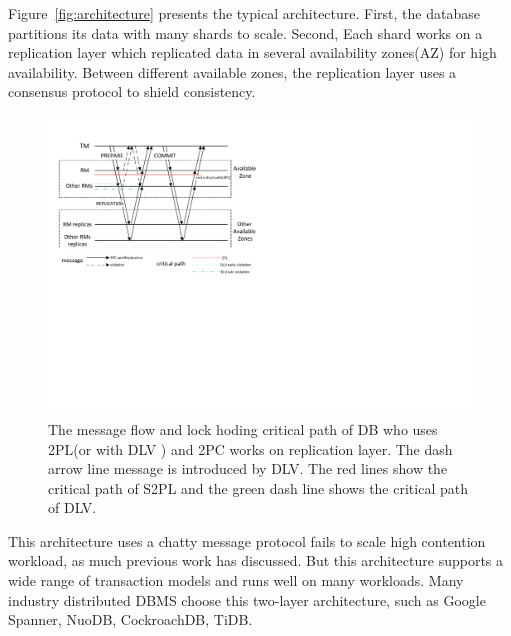 \documentclass[conference]{IEEEtran}
\begin{document}
Figure~\ref{fig:architecture} presents the typical architecture.
First, the database partitions its data with many shards to scale.
Second, Each shard works on a replication layer which replicated data in several availability zones(AZ)\cite{Aurora:conf/sigmod/VerbitskiGSCGBM18} for high availability.
Between different available zones, the replication layer uses a consensus protocol to shield consistency.
\begin{figure}[htbp]
  \centerline{\includegraphics[scale=0.62]{figure/message_flow.pdf}}
  \caption{The message flow and lock hoding critical path of DB who uses 2PL(or with DLV ) and 2PC works on replication layer. 
The dash arrow line message is introduced by DLV. The red lines show the critical path of S2PL and the green dash line shows the critical path of DLV.
  }
  \label{fig:two_layers_architecture}
\end{figure}

This architecture uses a chatty message protocol fails to scale high contention workload, as much previous work has discussed\cite{Calvin:conf/sigmod/ThomsonDWRSA12}\cite{Tapir:conf/sosp/ZhangSSKP15}\cite{Janus:conf/osdi/MuNLL16}.
But this architecture supports a wide range of transaction models and runs well on many workloads.
Many industry distributed DBMS choose this two-layer architecture, such as Google Spanner\cite{Spanner:conf/osdi/CorbettDEFFFGGHHHKKLLMMNQRRSSTWW12}\cite{Spanner:conf/sigmod/BaconBBCDFFGJKL17}, NuoDB\cite{NuoDB}, CockroachDB\cite{CockroachDB}, TiDB\cite{TiDB}.
\end{document}

